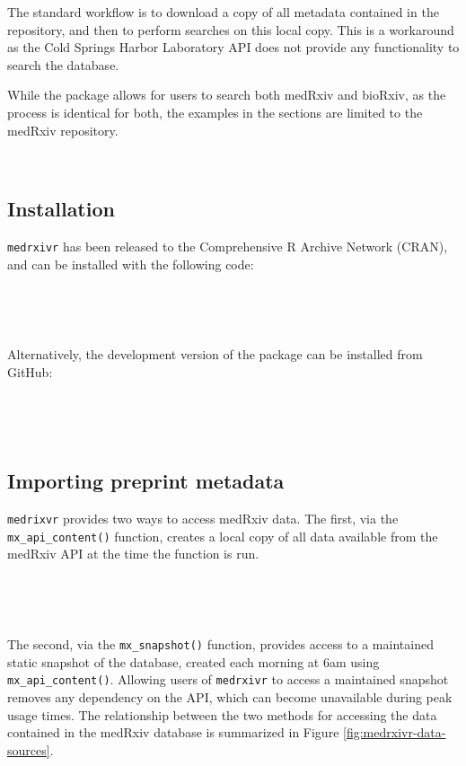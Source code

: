 \documentclass[a4paper, twoside]{templates/ociamthesis}
\begin{document}
The standard workflow is to download a copy of all metadata contained in the repository, and then to perform searches on this local copy. This is a workaround as the Cold Springs Harbor Laboratory API does not provide any functionality to search the database.

While the package allows for users to search both medRxiv and bioRxiv, as the process is identical for both, the examples in the sections are limited to the medRxiv repository.

~

\hypertarget{installation}{%
\subsection{Installation}\label{installation}}

\texttt{medrxivr} has been released to the Comprehensive R Archive Network (CRAN), and can be installed with the following code:

~

~

Alternatively, the development version of the package can be installed from GitHub:

~

~

\hypertarget{importing-preprint-metadata}{%
\subsection{Importing preprint metadata}\label{importing-preprint-metadata}}

\texttt{medrixvr} provides two ways to access medRxiv data. The first, via the \texttt{mx\_api\_content()} function, creates a local copy of all data available from the medRxiv API at the time the function is run.

~

~

The second, via the \texttt{mx\_snapshot()} function, provides access to a maintained static snapshot of the database, created each morning at 6am using \texttt{mx\_api\_content()}. Allowing users of \texttt{medrxivr} to access a maintained snapshot removes any dependency on the API, which can become unavailable during peak usage times. The relationship between the two methods for accessing the data contained in the medRxiv database is summarized in Figure \ref{fig:medrxivr-data-sources}.

~

~
\end{document}
